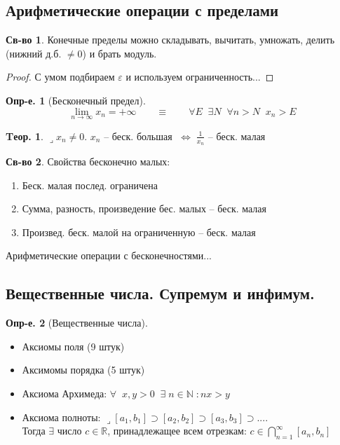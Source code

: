 \documentclass[a4paper,12pt]{article}
\numberwithin{figure}{section}
\theoremstyle{definition}
\newtheorem{definition}{Опр-е.}[section]
\newtheorem*{property}{Св-во}   %
\newtheorem{theorem}{Tеор.}[section]
\def\DS{\displaystyle}
\def\N{\mathbb{N}}
\def\R{\mathbb{R}}
\def\.{\;\;}
\def\eps{\varepsilon}
\def\ntoinf{n\to\infty}
\def\lets{{\huge$\lrcorner$}\space}
\def\iff{$\;\Longleftrightarrow\;$}
\begin{document}
\subsection{Арифметические операции с пределами}

\begin{property}
	Конечные пределы можно складывать, вычитать, умножать,
	делить (нижний д.б. $\ne0$) и брать модуль.
\end{property}
\begin{proof} С умом подбираем $\eps$ и используем ограниченность... \end{proof}


\begin{definition}[Бесконечный предел] \[
	\lim_{\ntoinf} x_n = +\infty
	\qquad\equiv\qquad
	\forall E \. \exists N \. \forall n>N \. x_n>E
\]
\end{definition}

\begin{theorem}
	\lets $x_n \neq 0$. $x_n$ -- беск. большая \iff $\DS\frac1{x_n}$ -- беск. малая
\end{theorem}

\begin{property}
	Свойства бесконечно малых:
	\begin{enumerate}
		\item Беск. малая послед. ограничена
		\item Сумма, разность, произведение бес. малых -- беск. малая
		\item Произвед. беск. малой на ограниченную -- беск. малая
	\end{enumerate}
\end{property}

\medskip
Арифметические операции с бесконечностями...


\subsection{Вещественные числа. Супремум и инфимум.}

\begin{definition}[Вещественные числа]
	\leavevmode
	\begin{itemize}
		\item Аксиомы поля (9 штук)
		\item Аксимомы порядка (5 штук)
		\item Аксиома Архимеда:
				$ \forall\. x,y>0 \. \exists \; n \in \N \;: nx>y $
		\item Аксиома полноты:
			\lets $[a_1,b_1] \supset [a_2,b_2] \supset [a_3,b_3] \supset...$.
			\\Тогда $\exists$ число $c \in \R$, принадлежащее всем отрезкам:
			$\DS c \in \bigcap_{n=1}^{\infty} [a_n,b_n]$
	\end{itemize}
\end{definition}
\end{document}
